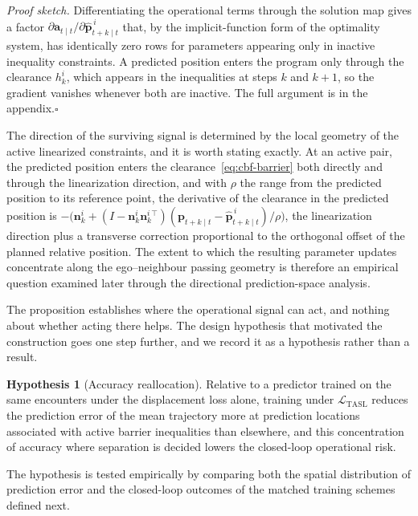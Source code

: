\documentclass[11pt]{article}
\theoremstyle{plain}
\theoremstyle{definition}
\newtheorem{hypothesis}{Hypothesis}
\begin{document}
\noindent\emph{Proof sketch.}
Differentiating the operational terms through the solution map gives a
factor $\partial \bm{a}_{t \mid t} / \partial
	\hat{\bm{p}}^{\,i}_{t+k \mid t}$ that, by the implicit-function form
of the optimality system, has identically zero rows for parameters appearing only in inactive inequality constraints. A predicted position enters the program only through the clearance $h^{i}_{k}$, which appears in the inequalities at steps $k$ and $k+1$, so the gradient vanishes whenever both are inactive. The full argument is in the appendix.\hfill$\square$
 
The direction of the surviving signal is determined by the local
geometry of the active linearized constraints, and it is worth stating
exactly. At an active pair, the predicted position enters the
clearance~\eqref{eq:cbf-barrier} both directly and through the
linearization direction, and with $\rho$ the range from the predicted
position to its reference point, the derivative of the clearance in
the predicted position is
$-\bigl( \bm{n}^{i}_{k}
	+ (I - \bm{n}^{i}_{k} \bm{n}^{i\,\top}_{k})
	(\bm{p}_{t+k \mid t} - \hat{\bm{p}}^{\,i}_{t+k \mid t}) / \rho
	\bigr)$,
the linearization direction plus a transverse correction proportional
to the orthogonal offset of the planned relative position. The extent to which the resulting parameter updates concentrate along
the ego--neighbour passing geometry is therefore an empirical question
examined later through the directional prediction-space analysis.
 
The proposition establishes where the operational signal can act, and
nothing about whether acting there helps. The design hypothesis that
motivated the construction goes one step further, and we record it as
a hypothesis rather than a result.
 
\begin{hypothesis}[Accuracy reallocation]
	\label{hyp:reallocation}
	Relative to a predictor trained on the same encounters under the
	displacement loss alone, training under
	$\mathcal{L}_{\mathrm{TASL}}$ reduces the prediction error of the
	mean trajectory more at prediction locations associated with active
	barrier inequalities than elsewhere, and this concentration of
	accuracy where separation is decided lowers the closed-loop
	operational risk.
\end{hypothesis}
 
The hypothesis is tested empirically by comparing both the spatial distribution of prediction error and the closed-loop outcomes of the matched training schemes defined next.
 
\end{document}
